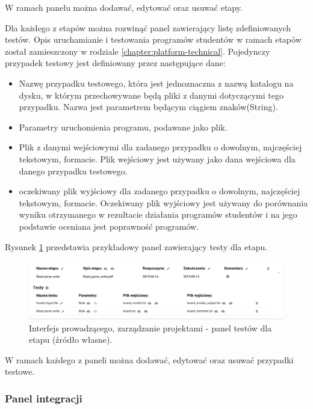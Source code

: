 W ramach panelu można dodawać, edytować oraz usuwać etapy.


Dla każdego z etapów można rozwinąć panel zawierający listę zdefiniowanych testów.
Opis uruchamianie i testowania programów studentów w ramach etapów został zamieszczony w rodziale \ref{chapter:platform-technical}.
Pojedynczy przypadek testowy jest definiowany przez następujące dane:
\begin {itemize}
    \item Nazwę przypadku testowego, która jest jednoznaczna z nazwą katalogu na dysku, w którym przechowywane będą pliki z danymi dotyczącymi tego przypadku.
    Nazwa jest parametrem będącym ciągiem znaków(String).
    \item Parametry uruchomienia programu, podawane jako plik.
    \item Plik z danymi wejściowymi dla zadanego przypadku o dowolnym, najczęściej tekstowym, formacie.
    Plik wejściowy jest używany jako dana wejściowa dla danego przypadku testowego.
    \item oczekiwany plik wyjściowy dla zadanego przypadku o dowolnym, najczęściej tekstowym, formacie.
    Oczekiwany plik wyjściowy jest używany do porównania wyniku otrzymanego w rezultacie działania programów studentów i na jego podstawie oceniana jest poprawność programów.
\end {itemize}

Rysunek \ref{fig:lecturer_stages_tests} przedstawia przykładowy panel zawierający testy dla etapu.

\begin{figure}[h]
    \centering
    \includegraphics[width = 15cm]{chapter04/lecturer_stages_tests.png}
    \caption{Interfejs prowadzącego, zarządzanie projektami - panel testów dla etapu (źródło własne).}
    \label{fig:lecturer_stages_tests}
\end{figure}

W ramach każdego z paneli można dodawać, edytować oraz usuwać przypadki testowe.

\subsubsection{Panel integracji}

